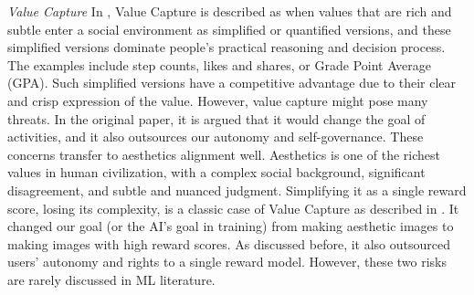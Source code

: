 \textit{Value Capture}
In \citet{nguyen_value_2024}, Value Capture is described as when values that are rich and subtle enter a social environment as simplified or quantified versions, and these simplified versions dominate people's practical reasoning and decision process. The examples include step counts, likes and shares, or Grade Point Average (GPA). Such simplified versions have a competitive advantage due to their clear and crisp expression of the value. However, value capture might pose many threats. In the original paper, it is argued that it would change the goal of activities, and it also outsources our autonomy and self-governance. These concerns transfer to aesthetics alignment well. Aesthetics is one of the richest values in human civilization, with a complex social background, significant disagreement, and subtle and nuanced judgment. Simplifying it as a single reward score, losing its complexity, is a classic case of Value Capture as described in \cite{nguyen_value_2024}. It changed our goal (or the AI's goal in training) from making aesthetic images to making images with high reward scores. As discussed before, it also outsourced users' autonomy and rights to a single reward model. However, these two risks are rarely discussed in ML literature.


